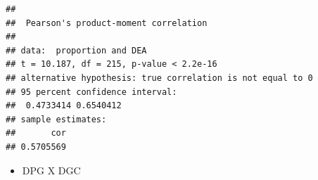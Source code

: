 \documentclass[]{article}
\newenvironment{Shaded}{\begin{snugshade}}{\end{snugshade}}
\newcommand{\KeywordTok}[1]{\textcolor[rgb]{0.13,0.29,0.53}{\textbf{#1}}}
\newcommand{\DataTypeTok}[1]{\textcolor[rgb]{0.13,0.29,0.53}{#1}}
\newcommand{\StringTok}[1]{\textcolor[rgb]{0.31,0.60,0.02}{#1}}
\newcommand{\OperatorTok}[1]{\textcolor[rgb]{0.81,0.36,0.00}{\textbf{#1}}}
\newcommand{\NormalTok}[1]{#1}
\providecommand{\tightlist}{%
  \setlength{\itemsep}{0pt}\setlength{\parskip}{0pt}}
\begin{document}
\begin{Shaded}
\end{Shaded}

\begin{verbatim}
## 
##  Pearson's product-moment correlation
## 
## data:  proportion and DEA
## t = 10.187, df = 215, p-value < 2.2e-16
## alternative hypothesis: true correlation is not equal to 0
## 95 percent confidence interval:
##  0.4733414 0.6540412
## sample estimates:
##       cor 
## 0.5705569
\end{verbatim}

\begin{itemize}
\tightlist
\item
  DPG X DGC
\end{itemize}
\end{document}
